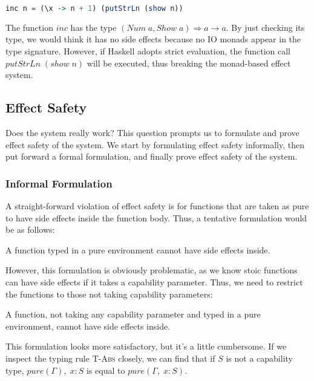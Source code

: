 \begin{lstlisting}[language=Haskell]
  inc n = (\x -> n + 1) (putStrLn (show n))
\end{lstlisting}

The function $inc$ has the type
$(Num\;a, Show\;a) \Rightarrow a \to a$. By just checking its type, we
would think it has no side effects because no IO monads appear in the
type signature. However, if Haskell adopts strict evaluation, the
function call $putStrLn \; (show \; n)$ will be executed, thus
breaking the monad-based effect system.

\subsection{Effect Safety}

Does the system really work? This question prompts us to formulate and
prove effect safety of the system. We start by formulating effect
safety informally, then put forward a formal formulation, and finally
prove effect safety of the system.

\subsubsection{Informal Formulation}

A straight-forward violation of effect safety is for functions that
are taken as pure to have side effects inside the function body. Thus,
a tentative formulation would be as follows:

\begin{definition}
A function typed in a pure environment cannot have side effects inside.
\end{definition}

However, this formulation is obviously problematic, as we know stoic
functions can have side effects if it takes a capability
parameter. Thus, we need to restrict the functions to those not taking
capability parameters:

\begin{definition}
  A function, not taking any capability parameter and typed in a pure
  environment, cannot have side effects inside.
\end{definition}

This formulation looks more satisfactory, but it's a little
cumbersome. If we inspect the typing rule \textsc{T-Abs} closely, we
can find that if $S$ is not a capability type, $pure(\Gamma),\; x: S$
is equal to $pure(\Gamma,\; x: S)$.

